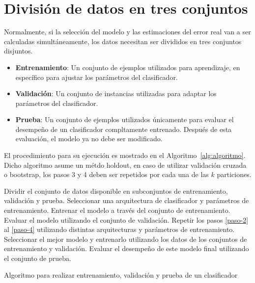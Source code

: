 \documentclass{article}
\begin{document}
\section{División de datos en tres conjuntos}
Normalmente, si la selección del modelo y las estimaciones del error real van a ser calculadas simultáneamente, los datos necesitan ser divididos en tres conjuntos disjuntos.
\begin{itemize}
	\item \textbf{Entrenamiento}: Un conjunto de ejemplos utilizados para aprendizaje, en específico para ajustar los parámetros del clasificador.
	\item \textbf{Validación}: Un conjunto de instancias utilizadas para adaptar los parámetros del clasificador.
	\item \textbf{Prueba}: Un conjunto de ejemplos utilizados únicamente para evaluar el desempeño de un clasificador compltamente entrenado. Después de esta evaluación, el modelo ya no debe ser modificado.
\end{itemize}

El procedimiento para su ejecución es mostrado en el Algoritmo~\ref{alg:algoritmo}. 
Dicho algoritmo asume un métdo holdout, en caso de utilizar validación cruzada o bootstrap, los pasos 3 y 4 deben ser repetidos por cada una de las $k$ particiones. 

\begin{algorithm} 
\begin{algorithmic}[1] 
\STATE Dividir el conjunto de datos disponible en subconjuntos de entrenamiento, validación y prueba.
\STATE Seleccionar una arquitectura de clasificador y parámetros de entrenamiento. \label{paso-2}
\STATE Entrenar el modelo a través del conjunto de entrenamiento. 
\STATE Evaluar el modelo utilizando el conjunto de validación. \label{paso-4}
\STATE Repetir los pasos \ref{paso-2} al \ref{paso-4} utilizando distintas arquitecturas y parámetros de entrenamiento.
\STATE Seleccionar el mejor modelo y entrenarlo utilizando los datos de los conjuntos de entrenamiento y validación.
\STATE Evaluar el desempeño de este modelo final utilizando el conjunto de prueba.
\end{algorithmic} 
\caption{Algoritmo para realizar entrenamiento, validación y prueba de un clasificador} 
\label{alg:algoritmo}
\end{algorithm}
\newpage 
\nocite{*}

 
\end{document}
